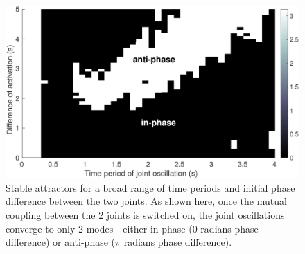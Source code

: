 \documentclass[12pt,twoside]{article}
\theoremstyle{plain}
\theoremstyle{definition}
\theoremstyle{remark}
\begin{document}
\begin{figure}[H]
\centering
\includegraphics[scale=0.35]{figures/5-1-stable-attractors.eps}
\caption{Stable attractors for a broad range of time periods and initial phase difference between the two joints. As shown here, once the mutual coupling between the 2 joints is switched on, the joint oscillations converge to only 2 modes - either in-phase (0 radians phase difference) or anti-phase ($\pi$ radians phase difference).}
\label{fig:stable-attractors}
\end{figure}
\end{document}
